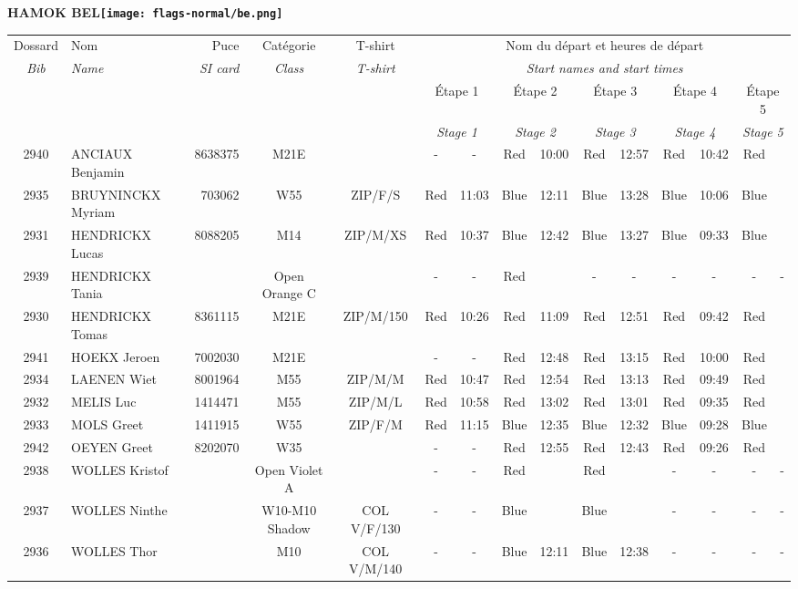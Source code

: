 \documentclass{report}
\begin{document}
\newpage
  \Huge \centering \bfseries HAMOK  BEL\normalfont \footnotesize \sffamily \hfill \texttt{[image: flags-normal/be.png]} \newline 
  \begin{longtable}{|c|l|r|c|c|*{5}{cc|}}
    Dossard & Nom  & Puce    & Catégorie & T-shirt & \multicolumn{10}{c|}{Nom du départ et heures de départ} \\
    \itshape Bib     & \itshape Name & \itshape SI card & \itshape Class  & \itshape  T-shirt  & \multicolumn{10}{c|}{\itshape Start names and start times} \\
    \hline
    & & & & & \multicolumn{2}{c|}{Étape 1} & \multicolumn{2}{c|}{Étape 2} & \multicolumn{2}{c|}{Étape 3} & \multicolumn{2}{c|}{Étape 4} & \multicolumn{2}{c|}{Étape 5} \\
    & & & & & \multicolumn{2}{c|}{\itshape Stage 1} & \multicolumn{2}{c|}{\itshape Stage 2} & \multicolumn{2}{c|}{\itshape Stage 3} & \multicolumn{2}{c|}{\itshape Stage 4} & \multicolumn{2}{c|}{\itshape Stage 5} \\
    \hline
    2940 & ANCIAUX Benjamin & 8638375 & M21E &   & - &  - & Red & 10:00 & Red & 12:57 & Red & 10:42 & Red &  \\
    2935 & BRUYNINCKX Myriam & 703062 & W55 & ZIP/F/S & Red & 11:03 & Blue & 12:11 & Blue & 13:28 & Blue & 10:06 & Blue &  \\
    2931 & HENDRICKX Lucas & 8088205 & M14 & ZIP/M/XS & Red & 10:37 & Blue & 12:42 & Blue & 13:27 & Blue & 09:33 & Blue &  \\
    2939 & HENDRICKX Tania &  & Open Orange C &   & - &  - & Red &   & - &  - & - &  - & - &  -\\
    2930 & HENDRICKX Tomas & 8361115 & M21E & ZIP/M/150 & Red & 10:26 & Red & 11:09 & Red & 12:51 & Red & 09:42 & Red &  \\
    2941 & HOEKX Jeroen & 7002030 & M21E &   & - &  - & Red & 12:48 & Red & 13:15 & Red & 10:00 & Red &  \\
    2934 & LAENEN Wiet & 8001964 & M55 & ZIP/M/M & Red & 10:47 & Red & 12:54 & Red & 13:13 & Red & 09:49 & Red &  \\
    2932 & MELIS Luc & 1414471 & M55 & ZIP/M/L & Red & 10:58 & Red & 13:02 & Red & 13:01 & Red & 09:35 & Red &  \\
    2933 & MOLS Greet & 1411915 & W55 & ZIP/F/M & Red & 11:15 & Blue & 12:35 & Blue & 12:32 & Blue & 09:28 & Blue &  \\
    2942 & OEYEN Greet & 8202070 & W35 &   & - &  - & Red & 12:55 & Red & 12:43 & Red & 09:26 & Red &  \\
    2938 & WOLLES Kristof &  & Open Violet A &   & - &  - & Red &   & Red &   & - &  - & - &  -\\
    2937 & WOLLES Ninthe &  & W10-M10 Shadow & COL V/F/130 & - &  - & Blue &   & Blue &   & - &  - & - &  -\\
    2936 & WOLLES Thor &  & M10 & COL V/M/140 & - &  - & Blue & 12:11 & Blue & 12:38 & - &  - & - &  -\\
  \end{longtable}
\end{document}
